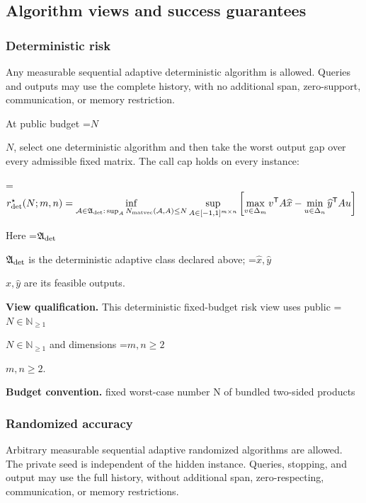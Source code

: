 \documentclass[10pt,a4paper]{article}
\newcommand{\AtlasMath}[1]{\par\begingroup\centering\setbox0=\hbox{$\displaystyle #1$}\ifdim\wd0>1.4\linewidth\typeout{ATLAS WIDE FORMULA: \the\wd0}\fi\ifdim\wd0>\linewidth\resizebox{\linewidth}{!}{\box0}\else\box0\fi\par\endgroup}
\newcommand{\AtlasInlineMath}[1]{\begingroup\setbox0=\hbox{$#1$}\ifdim\wd0>.4\linewidth\endgroup\AtlasMath{#1}\else\endgroup$#1$\fi}
\begin{document}
\subsection{Algorithm views and success guarantees}


\subsubsection{Deterministic risk}


Any measurable sequential adaptive deterministic algorithm is allowed. Queries and outputs may use the complete history, with no additional span, zero-support, communication, or memory restriction.



At public budget \AtlasInlineMath{N}, select one deterministic algorithm and then take the worst output gap over every admissible fixed matrix. The call cap holds on every instance:




\AtlasMath{r_{\rm det}^{\star}(N;m,n)=\inf_{\mathcal A\in\mathfrak A_{\rm det}:\,\sup_A N_{\rm matvec}(\mathcal A,A)\le N}\sup_{A\in[-1,1]^{m\times n}}\left[\max_{v\in\Delta_m}v^{\mathsf T}A\widehat x-\min_{u\in\Delta_n}\widehat y^{\mathsf T}Au\right]}




Here \AtlasInlineMath{\mathfrak A_{\rm det}} is the deterministic adaptive class declared above; \AtlasInlineMath{\widehat x,\widehat y} are its feasible outputs.



\textbf{View qualification.} This deterministic fixed-budget risk view uses public \AtlasInlineMath{N\in\mathbb N_{\ge1}} and dimensions \AtlasInlineMath{m,n\ge2}.



\textbf{Budget convention.} fixed worst-case number N of bundled two-sided products



\subsubsection{Randomized accuracy}


Arbitrary measurable sequential adaptive randomized algorithms are allowed. The private seed is independent of the hidden instance. Queries, stopping, and output may use the full history, without additional span, zero-respecting, communication, or memory restrictions.
\end{document}
